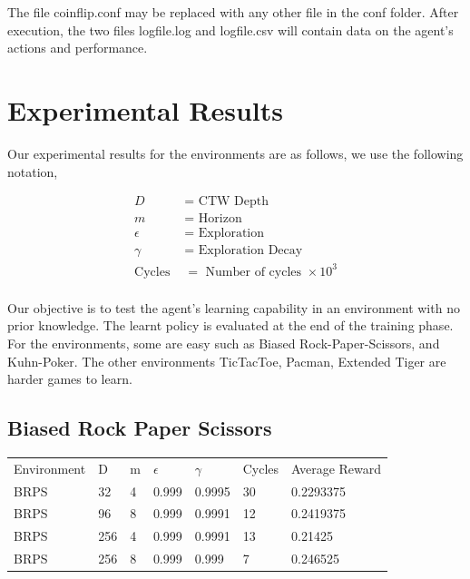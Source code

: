 \documentclass{article}
\theoremstyle{definition}
\newtheorem{primary statistics}[definition]{Primary Statistics}
\newtheorem{auxiliary statistics}[definition]{Auxiliary Statistics}
\begin{document}
The file coinflip.conf may be replaced with any other file in the conf folder.
After execution, the two files logfile.log and logfile.csv will contain data on the agent’s actions and performance.




\section{Experimental Results}

Our experimental results for the environments are as follows, we use the following notation,

 \begin{align*}
     D &= \text{ CTW Depth} \\
     m &= \text{ Horizon} \\
     \epsilon &= \text{ Exploration} \\
     \gamma &= \text{ Exploration Decay} \\
     \text{Cycles } &= \text{ Number of cycles } \times 10^3 \\
 \end{align*}
 
Our objective is to test the agent's learning capability in an environment with no prior knowledge. The learnt policy is evaluated at the end of the training phase. For the environments, some are easy such as Biased Rock-Paper-Scissors, and Kuhn-Poker. The other environments TicTacToe, Pacman, Extended Tiger are harder games to learn.




\newpage

\subsection{Biased Rock Paper Scissors}
\begin{tabular}{lllllll}
\centering
Environment & D & m & $\epsilon$ & $\gamma$ & Cycles & Average Reward \\
BRPS        & 32        & 4           & 0.999       & 0.9995            & 30     & 0.2293375        \\
BRPS        & 96        & 8           & 0.999       & 0.9991            & 12     & 0.2419375       \\
BRPS        & 256       & 4           & 0.999       & 0.9991            & 13     & 0.21425        \\
BRPS        & 256       & 8           & 0.999       & 0.999             & 7      & 0.246525        
\end{tabular}
\end{document}
